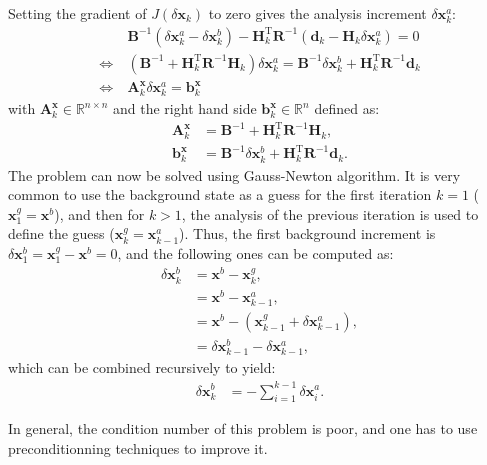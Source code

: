 \documentclass[npg, manuscript]{copernicus}
\begin{document}
Setting the gradient of $J(\delta \mathbf{x}_k)$ to zero gives the analysis increment $\delta \mathbf{x}^a_k$:
\begin{align}
\label{eq:inc}
& \ \mathbf{B}^{-1} \left(\delta \mathbf{x}^a_k - \delta \mathbf{x}^b_k\right) - \mathbf{H}_k^\mathrm{T} \mathbf{R}^{-1} \left(\mathbf{d}_k - \mathbf{H}_k \delta \mathbf{x}^a_k\right) = 0 \nonumber \\
\Leftrightarrow & \ \left(\mathbf{B}^{-1} + \mathbf{H}_k^\mathrm{T} \mathbf{R}^{-1} \mathbf{H}_k\right) \delta \mathbf{x}^a_k = \mathbf{B}^{-1} \delta \mathbf{x}^b_k + \mathbf{H}_k^\mathrm{T} \mathbf{R}^{-1} \mathbf{d}_k \nonumber \\
\Leftrightarrow & \ \boxed{\mathbf{A}^\mathbf{x}_k \delta \mathbf{x}^a_k = \mathbf{b}^\mathbf{x}_k}
\end{align}
with $\mathbf{A}^\mathbf{x}_k \in \mathbb{R}^{n \times n}$ and the right hand side $\mathbf{b}^\mathbf{x}_k \in \mathbb{R}^{n}$ defined as:
\begin{align}
\mathbf{A}^\mathbf{x}_k & = \mathbf{B}^{-1} + \mathbf{H}_k^\mathrm{T} \mathbf{R}^{-1} \mathbf{H}_k , \\
\mathbf{b}^\mathbf{x}_k & = \mathbf{B}^{-1} \delta \mathbf{x}^b_k + \mathbf{H}_k^\mathrm{T} \mathbf{R}^{-1} \mathbf{d}_k .
\end{align}
The problem can now be solved using Gauss-Newton algorithm. It is very common to use the background state as a guess for the first iteration $k=1$ ($\mathbf{x}^g_1 = \mathbf{x}^b$), and then for $k>1$, the analysis of the previous iteration is used to define the guess ($\mathbf{x}^g_k = \mathbf{x}^a_{k-1}$). Thus, the first background increment is $\delta \mathbf{x}^b_1 = \mathbf{x}^g_1 - \mathbf{x}^b = 0$, and the following ones can be computed as:
\begin{align}
\delta \mathbf{x}^b_k & = \mathbf{x}^b - \mathbf{x}^g_k, \nonumber \\
& = \mathbf{x}^b - \mathbf{x}^a_{k-1}, \nonumber \\
& = \mathbf{x}^b - \left(\mathbf{x}^g_{k-1} + \delta \mathbf{x}^a_{k-1}\right), \nonumber \\
& = \delta \mathbf{x}^b_{k-1} - \delta \mathbf{x}^a_{k-1},
\end{align}
which can be combined recursively to yield:
\begin{align}
\label{eq:back_inc}
\delta \mathbf{x}^b_k & = - \sum_{i=1}^{k-1} \delta \mathbf{x}^a_i.
\end{align}

In general, the condition number of this problem is poor, and one has to use preconditionning techniques to improve it.
\end{document}
